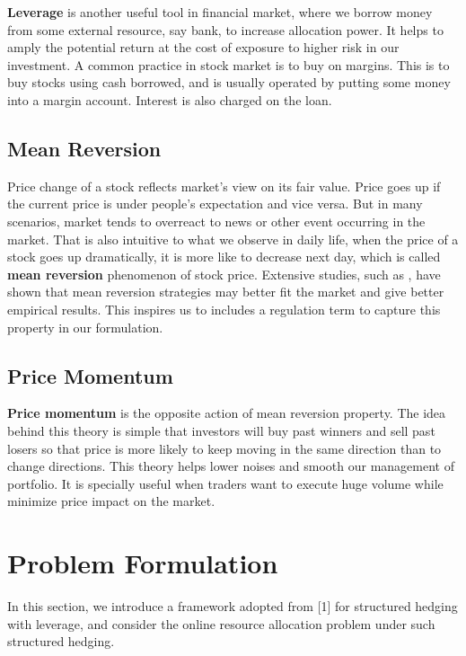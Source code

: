 \noindent \textbf{Leverage} is another useful tool in financial  market, where we borrow money from some external resource, say bank, to increase allocation power. It helps to amply the potential return at the cost of exposure to higher risk in our investment. A common practice in stock market is to buy on margins. This is to buy stocks using cash borrowed, and is usually operated by putting some money into a margin account. Interest is also charged on the loan.

\subsection{Mean Reversion}
Price change of a stock reflects market's view on its fair value. Price goes up if the current price is under people's expectation and vice versa. But in many scenarios, market tends to overreact to news or other event occurring in the market. That is also intuitive to what we observe in daily life, when the price of a stock goes up dramatically, it is more like to decrease next day, which is called \textbf{mean reversion} phenomenon of stock price. Extensive studies, such as \cite{li2012line}, have shown that mean reversion strategies may better fit the market and give better empirical results. This inspires us to includes a regulation term to  capture this property in our formulation.

\subsection{Price Momentum }
\textbf{Price momentum} is the opposite action of mean reversion property. The idea behind this theory is simple that investors will buy past winners and sell past losers so that price is more likely to keep moving in the same direction than to change directions. This theory helps lower noises and smooth our management of portfolio. It is specially useful when traders want to execute huge volume while minimize price impact on the market. 


\section{Problem Formulation}
In this section, we introduce a framework adopted from [1] for structured hedging with leverage, and consider the online resource allocation problem under such structured hedging.

